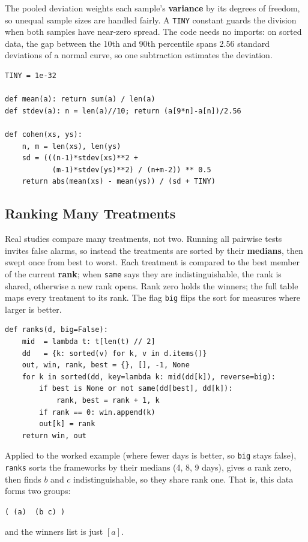 The pooled deviation weights each sample's \textbf{variance} by
its degrees of freedom, so unequal sample sizes are handled
fairly.
A \texttt{TINY} constant guards the division when both samples
have near-zero spread.
The code needs no imports: on sorted data, the gap between the
10th and 90th percentile spans 2.56 standard deviations of a
normal curve, so one subtraction estimates the deviation.

\begin{lstlisting}[style=py]
TINY = 1e-32

def mean(a): return sum(a) / len(a)
def stdev(a): n = len(a)//10; return (a[9*n]-a[n])/2.56

def cohen(xs, ys):
    n, m = len(xs), len(ys)
    sd = (((n-1)*stdev(xs)**2 +
           (m-1)*stdev(ys)**2) / (n+m-2)) ** 0.5
    return abs(mean(xs) - mean(ys)) / (sd + TINY)
\end{lstlisting}

\subsection{Ranking Many Treatments}
\label{sec:ranks}

Real studies compare many treatments, not two.
Running all pairwise tests invites false alarms, so instead the
treatments are sorted by their \textbf{medians}, then swept
once from best to worst.
Each treatment is compared to the best member of the current
\textbf{rank}; when \texttt{same} says they are indistinguishable, the
rank is shared, otherwise a new rank opens.
Rank zero holds the winners; the full table maps every
treatment to its rank.
The flag \texttt{big} flips the sort for measures where larger
is better.

\begin{lstlisting}[style=py]
def ranks(d, big=False):
    mid  = lambda t: t[len(t) // 2]
    dd   = {k: sorted(v) for k, v in d.items()}
    out, win, rank, best = {}, [], -1, None
    for k in sorted(dd, key=lambda k: mid(dd[k]), reverse=big):
        if best is None or not same(dd[best], dd[k]):
            rank, best = rank + 1, k
        if rank == 0: win.append(k)
        out[k] = rank
    return win, out
\end{lstlisting}

Applied to the worked example (where fewer days is better, so
\texttt{big} stays false), \texttt{ranks} sorts the frameworks
by their medians (4, 8, 9 days), gives $a$ rank zero, then
finds $b$ and $c$ indistinguishable, so they share rank one.
That is, this data forms two groups:
\begin{center}
\texttt{( (a)~~(b c) )}
\end{center}
and the winners list is just $[a]$.

